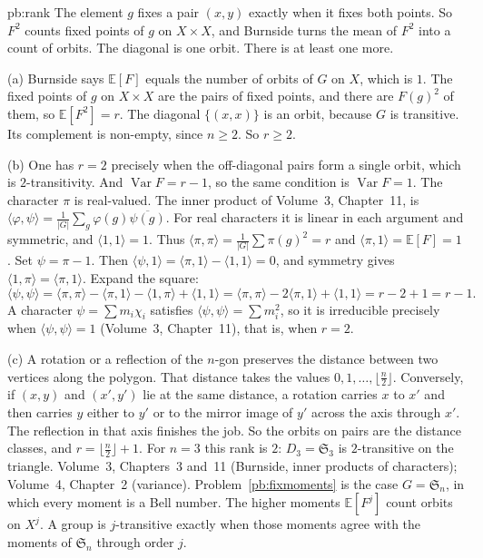 \begin{solution}{pb:rank}
\idea The element $g$ fixes a pair $(x,y)$ exactly when it fixes both points. So $F^2$ counts fixed points of $g$ on $X\times X$, and
Burnside turns the mean of $F^2$ into a count of orbits. The diagonal is one orbit. There is at least one more.

\writeup (a) Burnside says $\mathbb E[F]$ equals the number of orbits of $G$ on $X$, which is $1$. The fixed points of $g$ on $X\times X$
are the pairs of fixed points, and there are $F(g)^2$ of them, so $\mathbb E[F^2]=r$. The diagonal $\{(x,x)\}$ is an orbit, because $G$ is
transitive. Its complement is non-empty, since $n\ge2$. So $r\ge2$.

(b) One has $r=2$ precisely when the off-diagonal pairs form a single orbit, which is $2$-transitivity. And $\operatorname{Var}F=r-1$, so
the same condition is $\operatorname{Var}F=1$. The character $\pi$ is real-valued. The inner product of Volume~3, Chapter~11, is
$\langle\varphi,\psi\rangle=\frac1{|G|}\sum_g\varphi(g)\overline{\psi(g)}$. For real characters it is linear in each argument and symmetric, and $\langle1,1\rangle=1$. Thus $\langle\pi,\pi\rangle=\frac1{|G|}\sum\pi(g)^2=r$ and
$\langle\pi,1\rangle=\mathbb E[F]=1$. Set $\psi=\pi-1$. Then $\langle\psi,1\rangle=\langle\pi,1\rangle-\langle1,1\rangle=0$, and symmetry gives $\langle1,\pi\rangle=\langle\pi,1\rangle$. Expand the square:
\[
\langle\psi,\psi\rangle=\langle\pi,\pi\rangle-\langle\pi,1\rangle-\langle1,\pi\rangle+\langle1,1\rangle=\langle\pi,\pi\rangle-2\langle\pi,1\rangle+\langle1,1\rangle=r-2+1=r-1.
\]
A character $\psi=\sum m_i\chi_i$ satisfies $\langle\psi,\psi\rangle=\sum m_i^2$, so it is irreducible precisely when
$\langle\psi,\psi\rangle=1$ (Volume~3, Chapter~11), that is, when $r=2$.

(c) A rotation or a reflection of the $n$-gon preserves the distance between two vertices along the polygon. That distance takes the
values $0,1,\dots,\lfloor\frac n2\rfloor$. Conversely, if $(x,y)$ and $(x',y')$ lie at the same distance, a rotation carries $x$ to $x'$
and then carries $y$ either to $y'$ or to the mirror image of $y'$ across the axis through $x'$. The reflection in that axis finishes the job. So
the orbits on pairs are the distance classes, and $r=\lfloor\frac n2\rfloor+1$. For $n=3$ this rank is $2$: $D_3=\mathfrak S_3$ is
$2$-transitive on the triangle.
\tools Volume~3, Chapters~3 and~11 (Burnside, inner products of characters); Volume~4, Chapter~2 (variance).
\leads Problem~\ref{pb:fixmoments} is the case $G=\mathfrak S_n$, in which every moment is a Bell number. The higher moments
$\mathbb E[F^j]$ count orbits on $X^j$. A group is $j$-transitive exactly when those moments agree with the moments of $\mathfrak S_n$ through
order $j$.
\end{solution}

